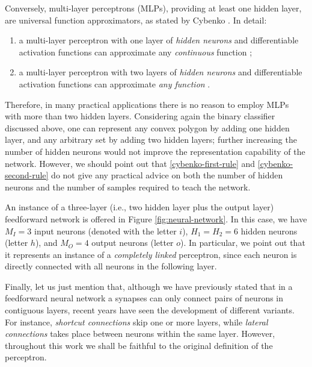 \documentclass[12pt, a4paper, twoside, openright]{report}
\numberwithin{equation}{chapter}
\theoremstyle{theorem}
\theoremstyle{definition}
\theoremstyle{remark}
\theoremstyle{proposition}
\numberwithin{figure}{chapter}
\begin{document}
		Conversely, multi-layer perceptrons (MLPs), providing at least one hidden layer, are universal function approximators, as stated by Cybenko \cite{Cyb88, Cyb89}. In detail:
		\begin{enumerate}[label=(\roman*)]
			\item a multi-layer perceptron with one layer of \emph{hidden neurons} and differentiable activation functions can approximate any \emph{continuous} function \cite{Cyb89};
			\label{cybenko-first-rule}
			\item a multi-layer perceptron with two layers of \emph{hidden neurons} and differentiable activation functions can approximate \emph{any function} \cite{Cyb88}.
			\label{cybenko-second-rule}
		\end{enumerate}
		Therefore, in many practical applications there is no reason to employ MLPs with more than two hidden layers. Considering again the binary classifier discussed above, one can represent any convex polygon by adding one hidden layer, and any arbitrary set by adding two hidden layers; further increasing the number of hidden neurons would not improve the representation capability of the network. However, we should point out that \ref{cybenko-first-rule} and \ref{cybenko-second-rule} do not give any practical advice on both the number of hidden neurons and the number of samples required to teach the network.
		
		An instance of a three-layer (i.e., two hidden layer plus the output layer) feedforward network is offered in Figure \ref{fig:neural-network}. In this case, we have $M_I = 3$ input neurons (denoted with the letter $i$), $H_1 = H_2 = 6$ hidden neurons (letter $h$), and $M_O = 4$ output neurons (letter $o$). In particular, we point out that it represents an instance of a \emph{completely linked} perceptron, since each neuron is directly connected with all neurons in the following layer.
		
		Finally, let us just mention that, although we have previously stated that in a feedforward neural network a synapses can only connect pairs of neurons in contiguous layers, recent years have seen the development of different variants. For instance, \emph{shortcut connections} skip one or more layers, while \emph{lateral connections} takes place between neurons within the same layer. However, throughout this work we shall be faithful to the original definition of the perceptron.
				
		\vspace*{0.3cm}
		
\end{document}
